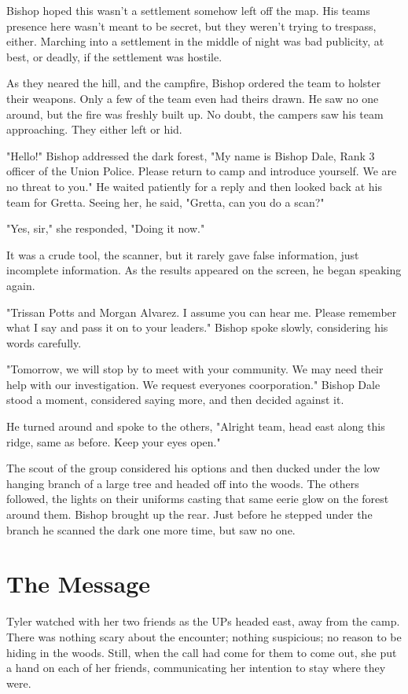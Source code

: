 \documentclass[courier]{sffms}
\begin{document}
Bishop hoped this wasn't a settlement
somehow left off the map. His teams presence
here wasn't meant to be secret, but they
weren't trying to trespass, either. Marching
into a settlement in the middle of night was
bad publicity, at best, or deadly, if the
settlement was hostile.

As they neared the hill, and the campfire,
Bishop ordered the team to holster their
weapons. Only a few of the team even had
theirs drawn. He saw no one around, but
the fire was freshly built up. No doubt, the
campers saw his team approaching. They
either left or hid.

"Hello!" Bishop addressed the dark forest,
"My name is Bishop Dale, Rank 3 officer of
the Union Police. Please return to camp and
introduce yourself. We are no threat to you."
He waited patiently for a reply and then
looked back at his team for Gretta. Seeing
her, he said, "Gretta, can you do a scan?"

"Yes, sir," she responded, "Doing it now."

It was a crude tool, the scanner, but it
rarely gave false information, just incomplete
information. As the results appeared on the
screen, he began speaking again.

"Trissan Potts and Morgan Alvarez. I assume
you can hear me. Please remember what I
say and pass it on to your leaders." Bishop
spoke slowly, considering his words carefully.

"Tomorrow, we will stop by to meet with
your community. We may need their help
with our investigation. We request everyones
coorporation." Bishop Dale stood a moment,
considered saying more, and then decided
against it.

He turned around and spoke to the others,
"Alright team, head east along this ridge,
same as before. Keep your eyes open."

The scout of the group considered his
options and then ducked under the low
hanging branch of a large tree and headed
off into the woods. The others followed,
the lights on their uniforms casting that
same eerie glow on the forest around them.
Bishop brought up the rear. Just before he
stepped under the branch he scanned the
dark one more time, but saw no one.

\chapter{The Message}
Tyler watched with her two friends as the
UPs headed east, away from the camp. There
was nothing scary about the encounter; nothing
suspicious; no reason to be hiding in the woods.
Still, when the call had come for them to come
out, she put a hand on each of her friends,
communicating her intention to stay 
where they were.
\end{document}

